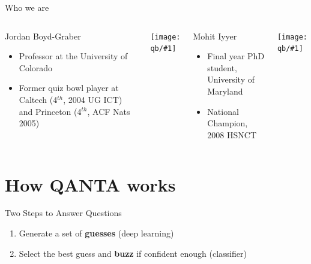 \documentclass[compress]{beamer}
\newcommand{\gfxq}[2]{
\begin{center}
	\texttt{[image: qb/\#1]}
\end{center}
}
\begin{document}
\begin{frame}{Who we are}

	\begin{columns}
			\begin{block}{Jordan Boyd-Graber}
			
			\begin{itemize}
				\item Professor at the University of Colorado
				\item Former quiz bowl player at Caltech (4$^{th}$, 2004 UG ICT) and Princeton (4$^{th}$, ACF Nats 2005)
			\end{itemize}
			
			\end{block}
			\gfxq{jordan_qb}{.5}
		
		
			\begin{block}{Mohit Iyyer}
			
			\begin{itemize}
				\item Final year PhD student, University of Maryland
				\item National Champion, 2008 HSNCT
			\end{itemize}
			
			\end{block}
			\gfxq{mohit_qb}{.5}	
	\end{columns}

\end{frame}

\section{How QANTA works}

\begin{frame}{Two Steps to Answer Questions}
	\begin{enumerate}
		\item Generate a set of {\bf guesses} (deep learning)
		\item Select the best guess and {\bf buzz} if confident enough (classifier)
	\end{enumerate}
\end{frame}
\end{document}
